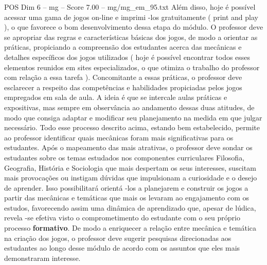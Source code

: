\begin{textsample}{POS Dim 6 – mg – Score 7.00 – mg/mg\_em\_95.txt}
Além disso, hoje é possível acessar uma gama de jogos on-line e imprimi -los gratuitamente ( print and play ), o que favorece o bom desenvolvimento dessa etapa do módulo.
O professor deve se apropriar das regras e características básicas dos jogos, de modo a orientar as práticas, propiciando a compreensão dos estudantes acerca das mecânicas e detalhes específicos dos jogos utilizados ( hoje é possível encontrar todos esses elementos reunidos em sites especializados, o que otimiza o trabalho do professor com relação a essa tarefa ).
Concomitante a essas práticas, o professor deve esclarecer a respeito das competências e habilidades propiciadas pelos jogos empregados em sala de aula.
A ideia é que se intercale aulas práticas e expositivas, mas sempre em observância ao andamento dessas duas atitudes, de modo que consiga adaptar e modificar seu planejamento na medida em que julgar necessário.
Todo esse processo descrito acima, estando bem estabelecido, permite ao professor identificar quais mecânicas foram mais significativas para os estudantes.
Após o mapeamento das mais atrativas, o professor deve sondar os estudantes sobre os temas estudados nos componentes curriculares Filosofia, Geografia, História e Sociologia que mais despertam os seus interesses, suscitam mais provocações ou instigam dúvidas que impulsionam a curiosidade e o desejo de aprender.
Isso possibilitará orientá -los a planejarem e construir os jogos a partir das mecânicas e temáticas que mais os levaram ao engajamento com os estudos, favorecendo assim uma dinâmica de aprendizado que, apesar de lúdica, revela -se efetiva visto o comprometimento do estudante com o seu próprio processo \textbf{formativo}.
De modo a enriquecer a relação entre mecânica e temática na criação dos jogos, o professor deve sugerir pesquisas direcionadas aos estudantes ao longo desse módulo de acordo com os assuntos que eles mais demonstraram interesse.

\end{textsample}
